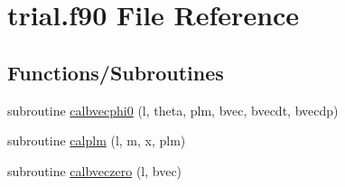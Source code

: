 \hypertarget{trial_8f90}{\section{trial.\-f90 File Reference}
\label{trial_8f90}
}
\subsection*{Functions/\-Subroutines}
\begin{DoxyCompactItemize}
\item 
subroutine \hyperlink{trial_8f90_a75074e6d274d30bb06c2e14f5a0da1f9}{calbvecphi0} (l, theta, plm, bvec, bvecdt, bvecdp)
\item 
subroutine \hyperlink{trial_8f90_adcd3d6dff34b72d1aa8a37507aff4ddb}{calplm} (l, m, x, plm)
\item 
subroutine \hyperlink{trial_8f90_a51008b56504fce7bff1a7bd0c0a33f14}{calbveczero} (l, bvec)
\end{DoxyCompactItemize}


